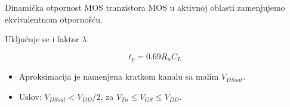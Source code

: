 \begin{frame}[label=09_1-s030]{Dinamička otpornost MOS tranzistora}\setlength{\parskip}{2pt}\setlength{\abovedisplayskip}{4pt}\setlength{\belowdisplayskip}{4pt}\setlength{\abovedisplayshortskip}{3pt}\setlength{\belowdisplayshortskip}{3pt}
MOS u aktivnoj oblasti zamenjujemo ekvivalentnom otpornošću.\par\alert{Uključuje se i faktor $\lambda$.}\begin{center}\hspace{12mm}\end{center}\[t_p=0.69R_nC_L\]
\begin{itemize}\setlength{\itemsep}{1pt}
\item Aproksimacija je namenjena kratkom kanalu sa malim $V_{DSsat}$.
\item Uslov: $V_{DSsat}<V_{DD}/2$, za $V_{Tn}\leq V_{GS}\leq V_{DD}$.

\end{itemize}
\end{frame}

